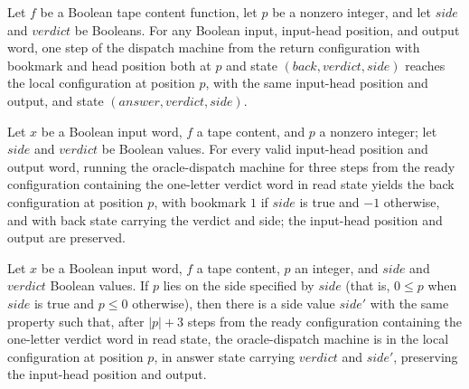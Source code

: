 \begin{theorem}
\label{Turing.oracleErase_step}
\leanok
{}
Let $f$ be a Boolean tape content function, let $p$ be a nonzero integer, and let $side$
and $verdict$ be Booleans. For any Boolean input, input-head position, and output word,
one step of the dispatch machine from the return configuration with bookmark and head
position both at $p$ and state $(back, verdict, side)$ reaches the local configuration
at position $p$, with the same input-head position and output, and state $(answer,
verdict, side)$.
\end{theorem}

\begin{theorem}
\label{Turing.oracleRestore_three}
\leanok
{}
Let $x$ be a Boolean input word, $f$ a tape content, and $p$ a nonzero integer; let
$side$ and $verdict$ be Boolean values. For every valid input-head position and output
word, running the oracle-dispatch machine for three steps from the ready configuration
containing the one-letter verdict word in read state yields the back configuration at
position $p$, with bookmark $1$ if $side$ is true and $-1$ otherwise, and with back
state carrying the verdict and side; the input-head position and output are preserved.
\end{theorem}

\begin{theorem}
\label{Turing.oracleRestore}
\leanok
{}
Let $x$ be a Boolean input word, $f$ a tape content, $p$ an integer, and $side$ and
$verdict$ Boolean values. If $p$ lies on the side specified by $side$ (that is, $0\le p$
when $side$ is true and $p\le0$ otherwise), then there is a side value $side'$ with the
same property such that, after $|p|+3$ steps from the ready configuration containing the
one-letter verdict word in read state, the oracle-dispatch machine is in the local
configuration at position $p$, in answer state carrying $verdict$ and $side'$,
preserving the input-head position and output.
\end{theorem}

